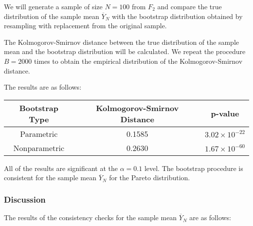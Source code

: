 \documentclass{article}
\begin{document}
We will generate a sample of size \(N = 100\) from \(F_2\) and compare the true distribution of the sample mean \(\overline{Y}_N\) with the bootstrap distribution obtained by resampling with replacement from the original sample.

The Kolmogorov-Smirnov distance between the true distribution of the sample mean and the bootstrap distribution will be calculated. We repeat the procedure \(B = 2000\) times to obtain the empirical distribution of the Kolmogorov-Smirnov distance.


The results are as follows:

\begin{table}[h]
\centering
\begin{tabular}{|c|c|c|}
\hline
\textbf{Bootstrap Type} & \textbf{Kolmogorov-Smirnov Distance} & \textbf{p-value} \\ \hline
Parametric & 0.1585 & \(3.02 \times 10^{-22}\) \\ \hline
Nonparametric & 0.2630 & \(1.67 \times 10^{-60}\) \\ \hline
\end{tabular}
\end{table}

All of the results are significant at the \(\alpha = 0.1\) level. The bootstrap procedure is consistent for the sample mean \(\overline{Y}_N\) for the Pareto distribution.


\subsubsection{Discussion}


The results of the consistency checks for the sample mean \(\overline{Y}_N\) are as follows:
\end{document}
